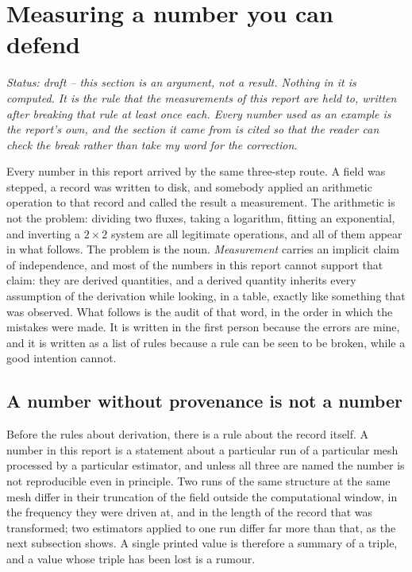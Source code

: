 \section{Measuring a number you can defend}
\label{sec:method}

\noindent\emph{Status: draft -- this section is an argument, not a result. Nothing in it is computed. It is the
rule that the measurements of this report are held to, written after breaking that rule at least once each.
Every number used as an example is the report's own, and the section it came from is cited so that the reader
can check the break rather than take my word for the correction.}

Every number in this report arrived by the same three-step route. A field was stepped, a record was written to
disk, and somebody applied an arithmetic operation to that record and called the result a measurement. The
arithmetic is not the problem: dividing two fluxes, taking a logarithm, fitting an exponential, and inverting a
$2\times 2$ system are all legitimate operations, and all of them appear in what follows. The problem is the
noun. \emph{Measurement} carries an implicit claim of independence, and most of the numbers in this report
cannot support that claim: they are derived quantities, and a derived quantity inherits every assumption of the
derivation while looking, in a table, exactly like something that was observed. What follows is the audit of
that word, in the order in which the mistakes were made. It is written in the first person because the errors
are mine, and it is written as a list of rules because a rule can be seen to be broken, while a good intention
cannot.

\subsection{A number without provenance is not a number}
\label{sec:method-provenance}

Before the rules about derivation, there is a rule about the record itself. A number in this report is a
statement about a particular run of a particular mesh processed by a particular estimator, and unless all three
are named the number is not reproducible even in principle. Two runs of the same structure at the same mesh
differ in their truncation of the field outside the computational window, in the frequency they were driven at,
and in the length of the record that was transformed; two estimators applied to one run differ far more than
that, as the next subsection shows. A single printed value is therefore a summary of a triple, and a value whose
triple has been lost is a rumour.

